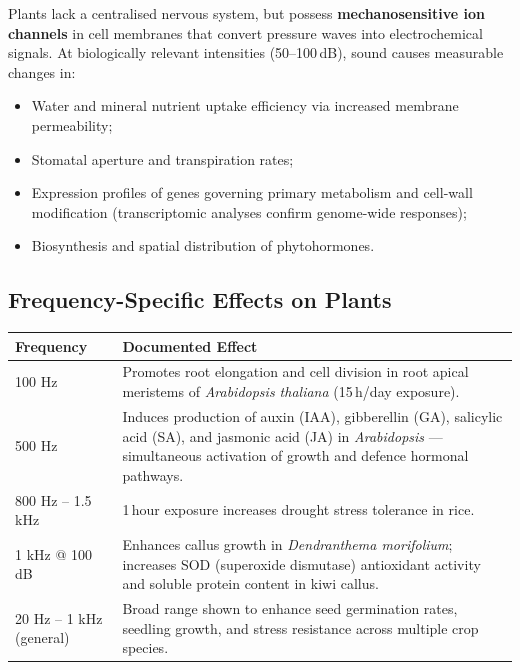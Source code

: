 \documentclass[12pt, a4paper]{article}
\newcommand{\Hz}[1]{\texttt{\textbf{\textcolor{forestgreen}{#1}}}}
\begin{document}
Plants lack a centralised nervous system, but possess \textbf{mechanosensitive ion channels}
in cell membranes that convert pressure waves into electrochemical signals. At biologically
relevant intensities (50--100\,dB), sound causes measurable changes in:

\begin{itemize}[itemsep=3pt]
  \item Water and mineral nutrient uptake efficiency via increased membrane permeability;
  \item Stomatal aperture and transpiration rates;
  \item Expression profiles of genes governing primary metabolism and cell-wall modification
        (transcriptomic analyses confirm genome-wide responses);
  \item Biosynthesis and spatial distribution of phytohormones.
\end{itemize}

\subsection{Frequency-Specific Effects on Plants}

\begin{center}
\begin{tabularx}{0.96\linewidth}{>{\Hz{}}p{2.5cm} X}
\toprule
\rowcolor{rowshade}
Frequency & Documented Effect \\
\midrule
100 Hz
  & Promotes root elongation and cell division in root apical meristems of
    \textit{Arabidopsis thaliana} (15\,h/day exposure). \\
500 Hz
  & Induces production of auxin (IAA), gibberellin (GA), salicylic acid (SA), and jasmonic
    acid (JA) in \textit{Arabidopsis} --- simultaneous activation of growth and defence
    hormonal pathways. \\
\rowcolor{rowshade}
800 Hz -- 1.5 kHz
  & 1\,hour exposure increases drought stress tolerance in rice. \\
1 kHz @ 100 dB
  & Enhances callus growth in \textit{Dendranthema morifolium}; increases SOD
    (superoxide dismutase) antioxidant activity and soluble protein content in kiwi callus. \\
\rowcolor{rowshade}
20 Hz -- 1 kHz (general)
  & Broad range shown to enhance seed germination rates, seedling growth, and stress
    resistance across multiple crop species. \\
\bottomrule
\end{tabularx}
\end{center}
\end{document}
